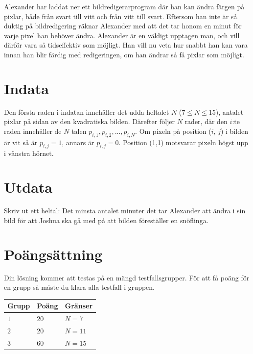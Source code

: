 \noindent
Alexander har laddat ner ett bildredigerarprogram där han kan ändra färgen på pixlar, både från svart till vitt och från vitt till svart. 
Eftersom han inte är så duktig på bildredigering räknar Alexander med att det tar honom en minut för varje pixel han behöver ändra.
Alexander är en väldigt upptagen man, och vill därför vara så tidseffektiv som möjligt.
Han vill nu veta hur snabbt han kan vara innan han blir färdig med redigeringen, om han ändrar så få pixlar som möjligt. 

\section*{Indata}
Den första raden i indatan innehåller det udda heltalet $N$ ($7 \le N \le 15$), antalet pixlar på sidan av den kvadratiska bilden.
Därefter följer $N$ rader, där den $i$:te raden innehåller de $N$ talen $p_{i,1}, p_{i,2}, ..., p_{i,N}$.
Om pixeln på position ($i$, $j$) i bilden är vit så är $p_{i,j} = 1$, annars är $p_{i,j} = 0$.
Position (1,1) motsvarar pixeln högst upp i vänstra hörnet.

\section*{Utdata}
Skriv ut ett heltal: Det minsta antalet minuter det tar Alexander att ändra i sin bild för att Joshua
ska gå med på att bilden föreställer en snöflinga.


\section*{Poängsättning}
Din lösning kommer att testas på en mängd testfallsgrupper.
För att få poäng för en grupp så måste du klara alla testfall i gruppen.

\noindent
\begin{tabular}{| l | l | p{12cm} |}
  \hline
  \textbf{Grupp} & \textbf{Poäng} & \textbf{Gränser} \\ \hline
  $1$    & $20$       & $N=7$ \\ \hline
  $2$    & $20$       & $N=11$ \\ \hline
  $3$    & $60$       & $N=15$ \\ \hline
\end{tabular}

